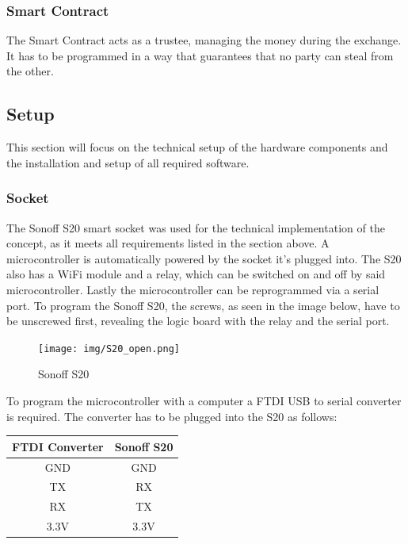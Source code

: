 \subsubsection{Smart Contract}
The Smart Contract acts as a trustee, managing the money during the exchange. It has to be programmed in a way that guarantees that no party can steal from the other.

\newpage
\subsection{Setup}
This section will focus on the technical setup of the hardware components and the installation and setup of all required software.
\\
\subsubsection{Socket}
The Sonoff S20 smart socket was used for the technical implementation of the concept, as it meets all requirements listed in the section above. A microcontroller is automatically powered by the socket it’s plugged into. The S20 also has a WiFi module and a relay, which can be switched on and off by said microcontroller. Lastly the microcontroller can be reprogrammed via a serial port.
To program the Sonoff S20, the screws, as seen in the image below, have to be unscrewed first, revealing the logic board with the relay and the serial port.
\\
\begin{figure}[h]
    \texttt{[image: img/S20\_open.png]}
    \caption{Sonoff S20}
    \label{fig:S20}
\end{figure}
\newpage
To program the microcontroller with a computer a FTDI USB to serial converter is required. The converter has to be plugged into the S20 as follows:
\\
\begin{center}
    \begin{tabular} { |c|c| }
        \hline
        FTDI Converter & Sonoff S20 \\
        \hline\hline
        GND & GND \\
        \hline
        TX & RX \\
        \hline
        RX & TX \\
        \hline
        3.3V & 3.3V \\
        \hline
    \end{tabular}
\end{center}
\leavevmode
\\

